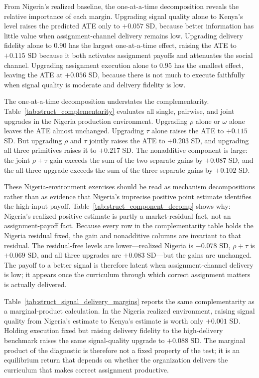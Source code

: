 \documentclass[11pt]{article}
\begin{document}
From Nigeria's realized baseline, the one-at-a-time decomposition reveals the relative importance of each margin. Upgrading signal quality alone to Kenya's level raises the predicted ATE only to $+0.057$ SD, because better information has little value when assignment-channel delivery remains low. Upgrading delivery fidelity alone to $0.90$ has the largest one-at-a-time effect, raising the ATE to $+0.115$ SD because it both activates assignment payoffs and attenuates the social channel. Upgrading assignment execution alone to $0.95$ has the smallest effect, leaving the ATE at $+0.056$ SD, because there is not much to execute faithfully when signal quality is moderate and delivery fidelity is low.

The one-at-a-time decomposition understates the complementarity. Table~\ref{tab:struct_complementarity} evaluates all single, pairwise, and joint upgrades in the Nigeria production environment. Upgrading $\rho$ alone or $\omega$ alone leaves the ATE almost unchanged. Upgrading $\tau$ alone raises the ATE to $+0.115$ SD. But upgrading $\rho$ and $\tau$ jointly raises the ATE to $+0.203$ SD, and upgrading all three primitives raises it to $+0.217$ SD. The nonadditive component is large: the joint $\rho+\tau$ gain exceeds the sum of the two separate gains by $+0.087$ SD, and the all-three upgrade exceeds the sum of the three separate gains by $+0.102$ SD.

These Nigeria-environment exercises should be read as mechanism decompositions rather than as evidence that Nigeria's imprecise positive point estimate identifies the high-input payoff. Table~\ref{tab:struct_component_decomp} shows why: Nigeria's realized positive estimate is partly a market-residual fact, not an assignment-payoff fact. Because every row in the complementarity table holds the Nigeria residual fixed, the gain and nonadditive columns are invariant to that residual. The residual-free levels are lower---realized Nigeria is $-0.078$ SD, $\rho+\tau$ is $+0.069$ SD, and all three upgrades are $+0.083$ SD---but the gains are unchanged. The payoff to a better signal is therefore latent when assignment-channel delivery is low; it appears once the curriculum through which correct assignment matters is actually delivered.



Table~\ref{tab:struct_signal_delivery_margins} reports the same complementarity as a marginal-product calculation. In the Nigeria realized environment, raising signal quality from Nigeria's estimate to Kenya's estimate is worth only $+0.001$ SD. Holding execution fixed but raising delivery fidelity to the high-delivery benchmark raises the same signal-quality upgrade to $+0.088$ SD. The marginal product of the diagnostic is therefore not a fixed property of the test; it is an equilibrium return that depends on whether the organization delivers the curriculum that makes correct assignment productive.
\end{document}
